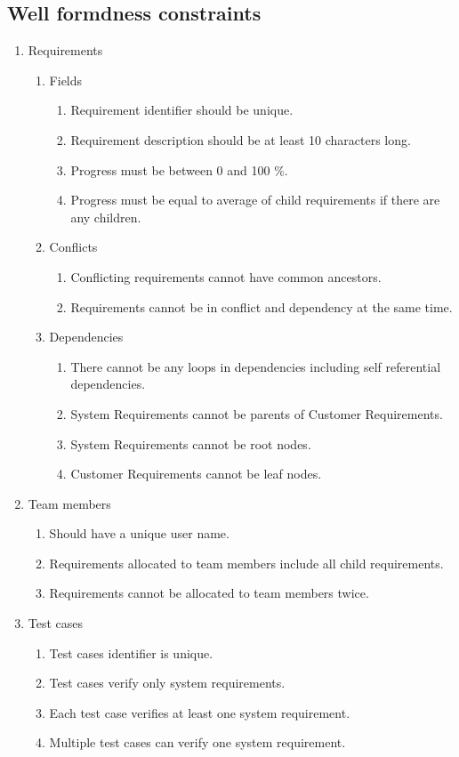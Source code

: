 \documentclass[11pt,a4paper]{scrartcl}
\begin{document}
\subsection{Well formdness constraints}
\begin{enumerate}
	\item Requirements
	\begin{enumerate}
		\item Fields
		\begin{enumerate}
			\item Requirement identifier should be unique.
			\item Requirement description should be at least 10 characters long.
		 	\item Progress must be between 0 and 100 \%.
			\item Progress must be equal to average of child requirements if there are any children.
		\end{enumerate}
		
		\item Conflicts
		\begin{enumerate}
			\item Conflicting requirements cannot have common ancestors.
			\item Requirements cannot be in conflict and dependency at the same time.
		\end{enumerate}
		
		\item Dependencies
		\begin{enumerate}
			\item There cannot be any loops in dependencies including self referential dependencies.
			\item System Requirements cannot be parents of Customer Requirements.
			\item System Requirements cannot be root nodes.
			\item Customer Requirements cannot be leaf nodes.	
		\end{enumerate}
		
	\end{enumerate}
	
	\item Team members
	\begin{enumerate}
		\item Should have a unique user name.
		\item Requirements allocated to team members include all child requirements.
		\item Requirements cannot be allocated to team members twice.
	\end{enumerate}
	
	\item Test cases
	\begin{enumerate}
		\item Test cases identifier is unique.
		\item Test cases verify only system requirements.
		\item Each test case verifies at least one system requirement.
		\item Multiple test cases can verify one system requirement.
	\end{enumerate}
\end{enumerate}
\end{document}
